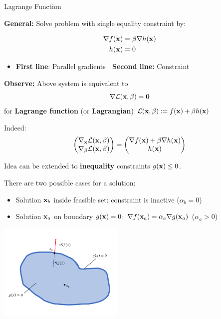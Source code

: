 \documentclass[11pt,compress,t,notes=noshow, xcolor=table]{beamer}
\begin{document}
\begin{vbframe}{Lagrange Function}

\textbf{General:} Solve problem with single equality constraint by:

\vspace{-\baselineskip}

\begin{align*}
    \nabla f(\mathbf{x}) &= \beta \nabla h(\mathbf{x}) \\
    h(\mathbf{x}) &= 0
\end{align*}

\begin{itemize}
    \item \textbf{First line}: Parallel gradients $|$ \textbf{Second line:} Constraint
\end{itemize}

\textbf{Observe:} Above system is equivalent to
\begin{equation*}
    \nabla \mathcal{L}(\mathbf{x}, \beta) = \mathbf{0}
\end{equation*}
for \textbf{Lagrange function} (or \textbf{Lagrangian}) $\mathcal{L}(\mathbf{x}, \beta) := f(\mathbf{x}) + \beta h(\mathbf{x})$

\medskip

Indeed:
\begin{equation*}
    \begin{pmatrix}
        \nabla_{\mathbf{x}} \mathcal{L}(\mathbf{x}, \beta) \\
        \nabla_\beta \mathcal{L}(\mathbf{x}, \beta)
    \end{pmatrix}
    = \begin{pmatrix}
        \nabla f(\mathbf{x}) + \beta \nabla h(\mathbf{x}) \\
        h(\mathbf{x})
    \end{pmatrix}
\end{equation*}

\framebreak

Idea can be extended to \textbf{inequality} constraints $g(\mathbf{x}) \leq 0$.

\medskip

There are two possible cases for a solution: 

\begin{itemize}
	\item Solution $\mathbf{x}_b$ inside feasible set: constraint is inactive ($\alpha_b =0$)
	\item Solution $\mathbf{x}_a$ on boundary $g(\mathbf{x}) = 0$: $\nabla f(\mathbf{x}_a) = \alpha_a \nabla g(\mathbf{x}_a)$ ($\alpha_a > 0$)
\end{itemize}

\begin{center}
	\includegraphics[width=0.45\textwidth]{figure_man/constraint_lagrange.png}
\end{center}
\end{vbframe}
\end{document}
